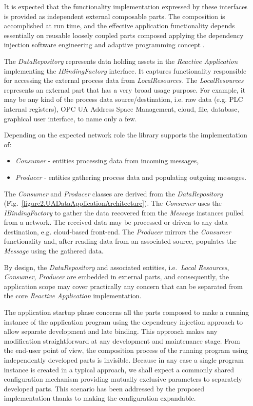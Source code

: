 \documentclass[runningheads]{llncs}
\begin{document}
It is expected that the functionality implementation expressed by these interfaces is provided as independent external composable parts. The composition is accomplished at run time, and the effective application functionality depends essentially on reusable loosely coupled parts composed applying the dependency injection software engineering and adaptive programming concept \cite{RefWorks:doc:5d9796cbe4b0f66c52dccf04}.

The \emph{DataRepository} represents data holding assets in the \emph{Reactive Application} implementing the \emph{IBindingFactory} interface. It captures functionality responsible for accessing the external process data from \emph{LocalResources}. The \emph{LocalResources} represents an external part that has a very broad usage purpose. For example, it may be any kind of the process data source/destination, i.e. raw data (e.g. PLC internal registers), OPC UA Address Space Management, cloud, file, database, graphical user interface, to name only a few.

Depending on the expected network role the library supports the implementation of:

\begin{itemize}
      \item \emph{Consumer} - entities processing data from incoming messages,
      \item \emph{Producer} - entities gathering process data and populating outgoing messages.
\end{itemize}

The \emph{Consumer} and \emph{Producer} classes are derived from the \emph{DataRepository} (Fig.~\ref{figure2.UADataApplicationArchitecture}). The \emph{Consumer} uses the \emph{IBindingFactory} to gather the data recovered from the \emph{Message} instances pulled from a network. The received data may be processed or driven to any data destination, e.g. cloud-based front-end. The \emph{Producer} mirrors the \emph{Consumer} functionality and, after reading data from an associated source, populates the \emph{Message} using the gathered data.

By design, the \emph{DataRepository} and associated entities, i.e.~\emph{Local Resources}, \emph{Consumer}, \emph{Producer} are embedded in external parts, and consequently, the application scope may cover practically any concern that can be separated from the core \emph{Reactive Application} implementation.

The application startup phase concerns all the parts composed to make a running instance of the application program using the dependency injection approach to allow separate development and late binding. This approach makes any modification straightforward at any development and maintenance stage. From the end-user point of view, the composition process of the running program using independently developed parts is invisible. Because in any case a single program instance is created in a typical approach, we shall expect a commonly shared configuration mechanism providing mutually exclusive parameters to separately developed parts. This scenario has been addressed by the proposed implementation thanks to making the configuration expandable.
\end{document}
